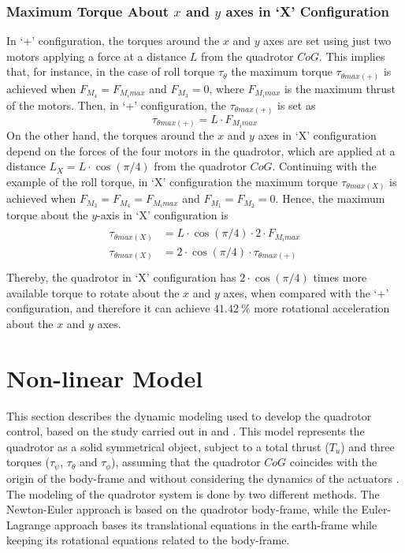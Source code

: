 \subsubsection{Maximum Torque About $x$ and $y$ axes in `X' Configuration}
In `+' configuration, the torques around the $x$ and $y$ axes are set using just two motors applying a force at a distance $L$ from the quadrotor $CoG$. This implies that, for instance, in the case of roll torque $\tau_\theta$ the maximum torque $\tau_{\theta max (+)}$ is achieved when $F_{M_4} = F_{M_i max}$ and $F_{M_3} = 0$, where $F_{M_i max}$ is the maximum thrust of the motors. Then, in `+' configuration, the $\tau_{\theta max (+)}$ is set as
\begin{equation}
\tau_{\theta max (+)} = L\cdot F_{M_i max}
\end{equation}
On the other hand, the torques around the $x$ and $y$ axes in `X' configuration depend on the forces of the four motors in the quadrotor, which are applied at a distance $L_{X} = L\cdot \cos(\pi/4)$ from the quadrotor $CoG$. Continuing with the example of the roll torque, in `X' configuration the maximum torque $\tau_{\theta max (X)}$ is achieved when $F_{M_3} = F_{M_4} = F_{M_i max}$ and $F_{M_1} = F_{M_2} = 0$. Hence, the maximum torque about the $y$-axis in `X' configuration is
\begin{align}
\begin{split}
\tau_{\theta max (X)} & = L\cdot \cos(\pi/4) \cdot 2 \cdot F_{M_i max}\\[5px]
\tau_{\theta max (X)} & = 2\cdot \cos(\pi/4) \cdot \tau_{\theta max (+)}\\[5px]
\end{split}
\end{align}
Thereby, the quadrotor in `X' configuration has $2\cdot \cos(\pi/4)$ times more available torque to rotate about the $x$ and $y$ axes, when compared with the `+' configuration, and therefore it can achieve $41.42\ \%$ more rotational acceleration about the $x$ and $y$ axes.


\section{Non-linear Model}
\label{sec:nonlinear}

This section describes the dynamic modeling used to develop the quadrotor control, based on the study carried out in \cite{Bresciani2008} and \cite{Bouabdallah2007}. This model represents the quadrotor as a solid symmetrical object, subject to a total thrust ($T_u$) and three torques ($\tau_\psi$, $\tau_\theta$ and $\tau_\phi$), assuming that the quadrotor $CoG$ coincides with the origin of the body-frame and without considering the dynamics of the actuators . The modeling of the quadrotor system is done by two different methods. The Newton-Euler approach is based on the quadrotor body-frame, while the Euler-Lagrange approach bases its translational equations in the earth-frame while keeping its rotational equations related to the body-frame.


